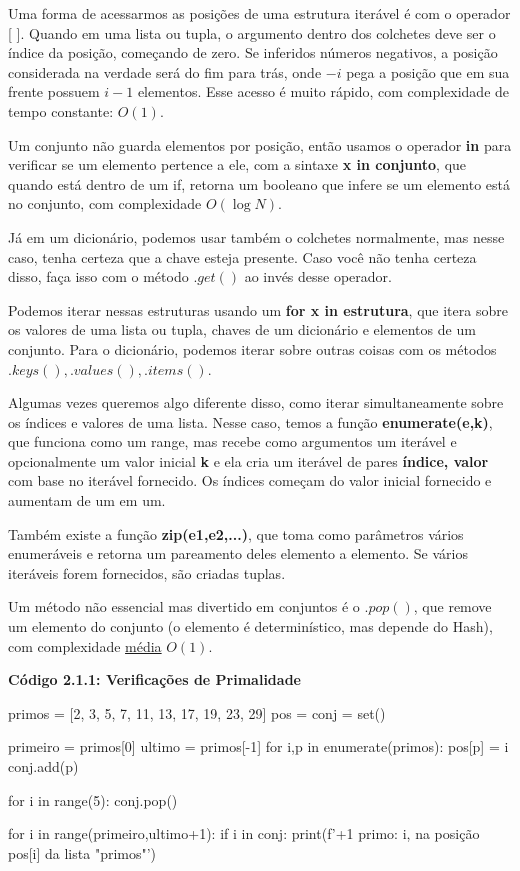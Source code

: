 \documentclass[11pt, a4paper]{article}
\begin{document}
Uma forma de acessarmos as posições de uma estrutura iterável é com o operador [ ]. Quando em uma lista ou tupla, o argumento dentro dos colchetes deve ser o índice da posição, começando de zero. Se inferidos números negativos, a posição considerada na verdade será do fim para trás, onde \(-i\) pega a posição que em sua frente possuem \(i-1\) elementos. Esse acesso é muito rápido, com complexidade de tempo constante: \(O(1)\).

Um conjunto não guarda elementos por posição, então usamos o operador \textbf{in} para verificar se um elemento pertence a ele, com a sintaxe \textbf{x in conjunto}, que quando está dentro de um if, retorna um booleano que infere se um elemento está no conjunto, com complexidade \(O(\log N)\).

Já em um dicionário, podemos usar também o colchetes normalmente, mas nesse caso, tenha certeza que a chave esteja presente. Caso você não tenha certeza disso, faça isso com o método \(.get()\) ao invés desse operador.

Podemos iterar nessas estruturas usando um \textbf{for x in estrutura}, que itera sobre os valores de uma lista ou tupla, chaves de um dicionário e elementos de um conjunto. Para o dicionário, podemos iterar sobre outras coisas com os métodos \(.keys(), .values(),.items()\).

Algumas vezes queremos algo diferente disso, como iterar simultaneamente sobre os índices e valores de uma lista. Nesse caso, temos a função \textbf{enumerate(e,k)}, que funciona como um range, mas recebe como argumentos um iterável e opcionalmente um valor inicial \textbf{k} e ela cria um iterável de pares \textbf{índice, valor} com base no iterável fornecido. Os índices começam do valor inicial fornecido e aumentam de um em um.

Também existe a função \textbf{zip(e1,e2,...)}, que toma como parâmetros vários enumeráveis e retorna um pareamento deles elemento a elemento. Se vários iteráveis forem fornecidos, são criadas tuplas.

Um método não essencial mas divertido em conjuntos é o \(.pop()\), que remove um elemento do conjunto (o elemento é determinístico, mas depende do Hash), com complexidade \href{https://en.wikipedia.org/wiki/Hash_collision}{média} \(O(1)\).

\textbf{Código 2.1.1: Verificações de Primalidade}

\begin{code}
primos = [2, 3, 5, 7, 11, 13, 17, 19, 23, 29]
pos = {}
conj = set()

primeiro = primos[0]
ultimo = primos[-1]
for i,p in enumerate(primos):
	pos[p] = i
	conj.add(p)
  
for i in range(5):
    conj.pop()

for i in range(primeiro,ultimo+1):
	if i in conj:
		print(f'+1 primo: {i}, na posição {pos[i]} da lista "primos"')
\end{code}
\end{document}
